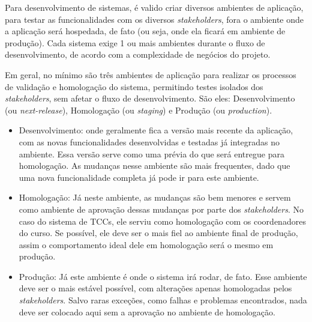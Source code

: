 Para desenvolvimento de sistemas, é valido criar diversos ambientes de aplicação, para testar as funcionalidades com os diversos \textit{stakeholders}, fora o ambiente onde a aplicação será hospedada, de fato (ou seja, onde ela ficará em ambiente de produção). Cada sistema exige 1 ou mais ambientes durante o fluxo de desenvolvimento, de acordo com a complexidade de negócios do projeto.

Em geral, no mínimo são três ambientes de aplicação para realizar os processos de validação e homologação do sistema, permitindo testes isolados dos \textit{stakeholders}, sem afetar o fluxo de desenvolvimento. São eles: Desenvolvimento (ou \textit{next-release}), Homologação (ou \textit{staging}) e Produção (ou \textit{production})\cite{tracyragan2017}.

\begin{itemize}
    \item Desenvolvimento: onde geralmente fica a versão mais recente da aplicação, com as novas funcionalidades desenvolvidas e testadas já integradas no ambiente. Essa versão serve como uma prévia do que será entregue para homologação. As mudanças nesse ambiente são mais frequentes, dado que uma nova funcionalidade completa já pode ir para este ambiente.

    \item Homologação: Já neste ambiente, as mudanças são bem menores e servem como ambiente de aprovação dessas mudanças por parte dos \textit{stakeholders}. No caso do sistema de TCCs, ele serviu como homologação com os coordenadores do curso. Se possível, ele deve ser o mais fiel ao ambiente final de produção, assim o comportamento ideal dele em homologação será o mesmo em produção.

    \item Produção: Já este ambiente é onde o sistema irá rodar, de fato. Esse ambiente deve ser o mais estável possível, com alterações apenas homologadas pelos \textit{stakeholders}. Salvo raras exceções, como falhas e problemas encontrados, nada deve ser colocado aqui sem a aprovação no ambiente de homologação.
\end{itemize}